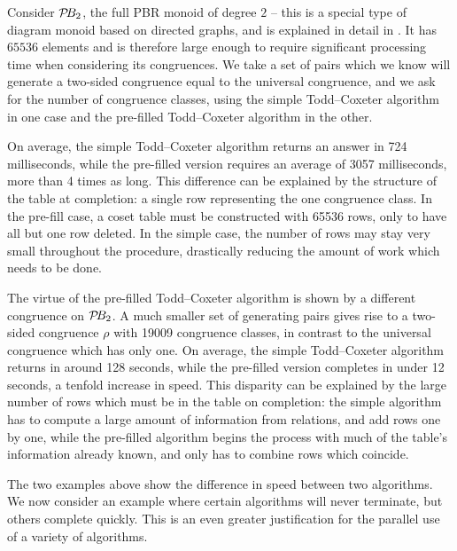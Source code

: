 \begin{example}
  \label{ex:good-tc}
  Consider $\mathcal{P}\!B_2$, the full PBR monoid of degree $2$ -- this is a special type
  of diagram monoid based on directed graphs, and is explained in detail in
  \cite[\S2.1]{diagram_semigroups}.  It has $65536$ elements and is therefore
  large enough to require significant processing time when considering its
  congruences.  We take a set of pairs which we know will generate a two-sided
  congruence equal to the universal congruence, and we ask \libsemigroups{} for
  the number of congruence classes, using the simple Todd--Coxeter algorithm in one case and
  the pre-filled Todd--Coxeter algorithm in the other.

  On average, the simple Todd--Coxeter algorithm returns an answer in 724 milliseconds, while
  the pre-filled version requires an average of 3057 milliseconds, more than 4
  times as long.  This difference can be explained by the structure
  of the table at completion: a single row representing the one congruence
  class.  In the pre-fill case, a coset table must be constructed with 65536
  rows, only to have all but one row deleted.  In the simple case,
  the number of rows may stay very small throughout the procedure, drastically
  reducing the amount of work which needs to be done.
\end{example}

\begin{example}
  \label{ex:good-tc-prefill}
  The virtue of the pre-filled Todd--Coxeter algorithm is shown by a different congruence on
  $\mathcal{P}\!B_2$.  A much smaller set of generating pairs gives rise to a two-sided congruence
  $\rho$ with 19009 congruence classes, in contrast to the universal congruence
  which has only one.  On average, the simple Todd--Coxeter algorithm returns in around 128
  seconds, while the pre-filled version completes in under 12 seconds, a tenfold
  increase in speed.  This disparity can be explained by the large number of
  rows which must be in the table on completion: the simple algorithm has to
  compute a large amount of information from relations, and add rows one by one,
  while the pre-filled algorithm begins the process with much of the table's
  information already known, and only has to combine rows which coincide.
\end{example}

The two examples above show the difference in speed between two algorithms.  We
now consider an example where certain algorithms will never terminate, but
others complete quickly.  This is an even greater justification for the parallel
use of a variety of algorithms.

